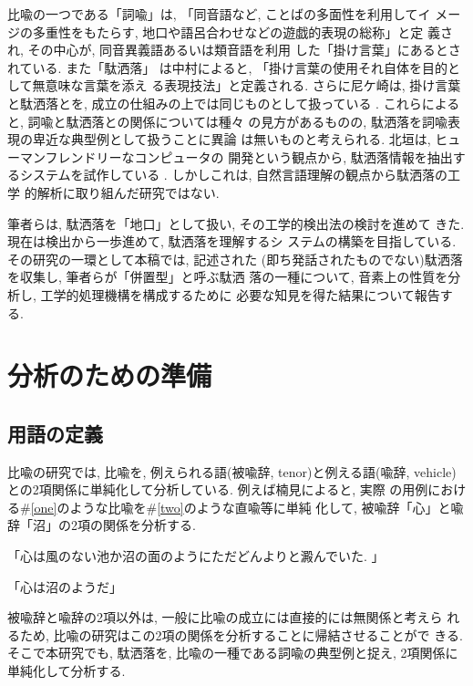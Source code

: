 比喩の一つである「詞喩」は, 「同音語など, ことばの多面性を利用してイ
メージの多重性をもたらす, 地口や語呂合わせなどの遊戯的表現の総称」と定
義され\cite{Nakamura1991}, その中心が, 同音異義語あるいは類音語を利用
した「掛け言葉」にあるとされている\cite{Nakamura1977}. また「駄洒落」
は中村によると, 「掛け言葉の使用それ自体を目的として無意味な言葉を添え
る表現技法」と定義される\cite{Nakamura1991}. さらに尼ケ崎は, 掛け言葉
と駄洒落とを, 成立の仕組みの上では同じものとして扱っている
\cite{Amagasaki1988}. これらによると, 詞喩と駄洒落との関係については種々
の見方があるものの, 駄洒落を詞喩表現の卑近な典型例として扱うことに異論
は無いものと考えられる. 北垣は, ヒューマンフレンドリーなコンピュータの
開発という観点から, 駄洒落情報を抽出するシステムを試作している
\cite{Kitagaki1993}. しかしこれは, 自然言語理解の観点から駄洒落の工学
的解析に取り組んだ研究ではない.  
  
筆者らは, 駄洒落を「地口」として扱い, その工学的検出法の検討を進めて
きた\cite{Takizawa1989}. 現在は検出から一歩進めて, 駄洒落を理解するシ
ステムの構築を目指している. その研究の一環として本稿では, 記述された
(即ち発話されたものでない)駄洒落を収集し, 筆者らが「併置型」と呼ぶ駄洒
落の一種について, 音素上の性質を分析し, 工学的処理機構を構成するために
必要な知見を得た結果について報告する.   


\section{分析のための準備}\label{pre}

\subsection{用語の定義}\label{pre-def}

比喩の研究では, 比喩を, 例えられる語(被喩辞, tenor)と例える語(喩辞, 
vehicle)との2項関係に単純化して分析している. 例えば楠見によると, 実際
の用例における\#\ref{one}のような比喩を\#\ref{two}のような直喩等に単純
化して, 被喩辞「心」と喩辞「沼」の2項の関係を分析する\cite{Haga1990}.  

\vspace*{1em}\begin{sample}
\item 「心は風のない池か沼の面のようにただどんよりと澱んでいた. 」\label{one}
\item 「心は沼のようだ」\label{two}
\end{sample}\vspace*{1em}
被喩辞と喩辞の2項以外は, 一般に比喩の成立には直接的には無関係と考えら
れるため, 比喩の研究はこの2項の関係を分析することに帰結させることがで
きる. そこで本研究でも, 駄洒落を, 比喩の一種である詞喩の典型例と捉え, 
2項関係に単純化して分析する.  

